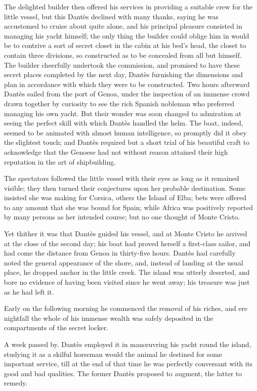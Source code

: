  The delighted builder then offered his services in providing a suitable crew for the little vessel, but this Dantès declined with many thanks, saying he was accustomed to cruise about quite alone, and his principal pleasure consisted in managing his yacht himself; the only thing the builder could oblige him in would be to contrive a sort of secret closet in the cabin at his bed's head, the closet to contain three divisions, so constructed as to be concealed from all but himself. The builder cheerfully undertook the commission, and promised to have these secret places completed by the next day, Dantès furnishing the dimensions and plan in accordance with which they were to be constructed.  Two hours afterward Dantès sailed from the port of Genoa, under the inspection of an immense crowd drawn together by curiosity to see the rich Spanish nobleman who preferred managing his own yacht. But their wonder was soon changed to admiration at seeing the perfect skill with which Dantès handled the helm. The boat, indeed, seemed to be animated with almost human intelligence, so promptly did it obey the slightest touch; and Dantès required but a short trial of his beautiful craft to acknowledge that the Genoese had not without reason attained their high reputation in the art of shipbuilding. 

 The spectators followed the little vessel with their eyes as long as it remained visible; they then turned their conjectures upon her probable destination. Some insisted she was making for Corsica, others the Island of Elba; bets were offered to any amount that she was bound for Spain; while Africa was positively reported by many persons as her intended course; but no one thought of Monte Cristo. 

 Yet thither it was that Dantès guided his vessel, and at Monte Cristo he arrived at the close of the second day; his boat had proved herself a first-class sailor, and had come the distance from Genoa in thirty-five hours. Dantès had carefully noted the general appearance of the shore, and, instead of landing at the usual place, he dropped anchor in the little creek. The island was utterly deserted, and bore no evidence of having been visited since he went away; his treasure was just as he had left it. 

 Early on the following morning he commenced the removal of his riches, and ere nightfall the whole of his immense wealth was safely deposited in the compartments of the secret locker. 

 A week passed by. Dantès employed it in manœuvring his yacht round the island, studying it as a skilful horseman would the animal he destined for some important service, till at the end of that time he was perfectly conversant with its good and bad qualities. The former Dantès proposed to augment, the latter to remedy. 

